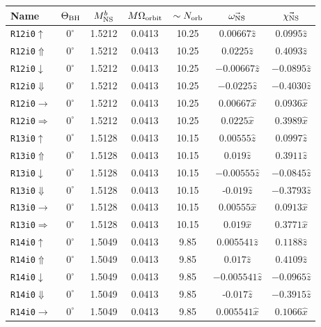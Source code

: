 \begin{longtable}{l|c|c|c|c|c|c}
\centering
\label{Tab:36Sets}
Name & $\Theta_{\rm BH}$ & $M^b_{\rm NS}$ & $M\Omega_{\rm orbit}$ & $\sim N_{\rm orb}$ & $\vec{\omega_{\rm NS}}$ & $\vec{\chi_{\rm NS}}$  
\\\hline
{\tt R12i0$\uparrow$}&$0^\circ$ & 1.5212 & 0.0413 & 10.25 & $0.00667\hat{z}$ & $0.0995\hat{z}$ \\
{\tt R12i0$\Uparrow$}&$0^\circ$ & 1.5212 & 0.0413 & 10.25 & $0.0225\hat{z}$ & $0.4093\hat{z}$ \\
{\tt R12i0$\downarrow$}&$0^\circ$ & 1.5212 & 0.0413 & 10.25 & $-0.00667\hat{z}$& $-0.0895\hat{z}$\\
{\tt R12i0$\Downarrow$}&$0^\circ$ & 1.5212 & 0.0413 & 10.25 & $-0.0225\hat{z}$ & $-0.4030\hat{z}$ \\
{\tt R12i0$\rightarrow$}&$0^\circ$ & 1.5212 & 0.0413 & 10.25 & $0.00667\hat{x}$ & $0.0936\hat{x}$\\
{\tt R12i0$\Rightarrow$}&$0^\circ$ & 1.5212 & 0.0413 & 10.25 & $0.0225\hat{x}$ & $0.3989\hat{x}$ \\
\hline
{\tt R13i0$\uparrow$}&$0^\circ$ & 1.5128 & 0.0413  & 10.15 & $0.00555\hat{z}$ & $0.0997\hat{z}$ \\
{\tt R13i0$\Uparrow$}&$0^\circ$ & 1.5128 & 0.0413 & 10.15 & $0.019\hat{z}$ & $0.3911\hat{z}$ \\
{\tt R13i0$\downarrow$}&$0^\circ$ & 1.5128 & 0.0413 & 10.15 & $-0.00555\hat{z}$& $-0.0845\hat{z}$\\
{\tt R13i0$\Downarrow$}&$0^\circ$ & 1.5128 & 0.0413 & 10.15 & -$0.019\hat{z}$ & $-0.3793\hat{z}$ \\
{\tt R13i0$\rightarrow$}&$0^\circ$ & 1.5128 & 0.0413 & 10.15 & $0.00555\hat{x}$ & $0.0913\hat{x}$\\
{\tt R13i0$\Rightarrow$}&$0^\circ$ & 1.5128 & 0.0413 & 10.15 & $0.019\hat{x}$ & $0.3771\hat{x}$ \\
\hline
{\tt R14i0$\uparrow$}&$0^\circ$ & 1.5049 & 0.0413 & 9.85 & $0.005541\hat{z}$ & $0.1188\hat{z}$ \\
{\tt R14i0$\Uparrow$}&$0^\circ$ & 1.5049 & 0.0413 & 9.85 & $0.017\hat{z}$ & $0.4109\hat{z}$ \\
{\tt R14i0$\downarrow$}&$0^\circ$ & 1.5049 & 0.0413 & 9.85 & $-0.005541\hat{z}$& $-0.0965\hat{z}$\\
{\tt R14i0$\Downarrow$}&$0^\circ$ & 1.5049 & 0.0413 & 9.85 & -$0.017\hat{z}$ & $-0.3915\hat{z}$\\
{\tt R14i0$\rightarrow$}&$0^\circ$ & 1.5049 & 0.0413 & 9.85 & $0.005541\hat{x}$ & $0.1066\hat{x}$\\

\end{longtable}
